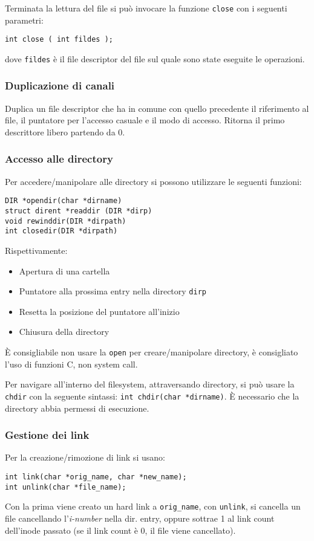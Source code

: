 \documentclass[a4paper, 10pt]{article}
\begin{document}
Terminata la lettura del file si può invocare la funzione \verb|close| con i seguenti parametri:
\begin{verbatim}
int close ( int fildes );
\end{verbatim}
dove \verb|fildes| è il file descriptor del file sul quale sono state eseguite le operazioni.

\subsubsection{Duplicazione di canali}
Duplica un file descriptor che ha in comune con quello precedente il riferimento al file, il puntatore per l'accesso casuale e il modo di accesso. Ritorna il primo descrittore libero partendo da 0.

\subsubsection{Accesso alle directory}
Per accedere/manipolare alle directory si possono utilizzare le seguenti funzioni:
\begin{verbatim}
DIR *opendir(char *dirname)
struct dirent *readdir (DIR *dirp)
void rewinddir(DIR *dirpath)
int closedir(DIR *dirpath)
\end{verbatim}
Rispettivamente:
\begin{itemize}
\item Apertura di una cartella
\item Puntatore alla prossima entry nella directory \verb|dirp|
\item Resetta la posizione del puntatore all'inizio
\item Chiusura della directory
\end{itemize}
È consigliabile non usare la \verb|open| per creare/manipolare directory, è consigliato l'uso di funzioni C, non system call.

Per navigare all'interno del filesystem, attraversando directory, si può usare la \verb|chdir| con la seguente sintassi:
\verb|int chdir(char *dirname)|. È necessario che la directory abbia permessi di esecuzione.

\subsubsection{Gestione dei link}
Per la creazione/rimozione di link si usano:
\begin{verbatim}
int link(char *orig_name, char *new_name);
int unlink(char *file_name);
\end{verbatim}
Con la prima viene creato un hard link a \verb|orig_name|, con \verb|unlink|, si cancella un file cancellando l'\textit{i-number} nella dir. entry, oppure sottrae 1 al link count dell'inode passato (se il link count è 0, il file viene cancellato).
\end{document}
